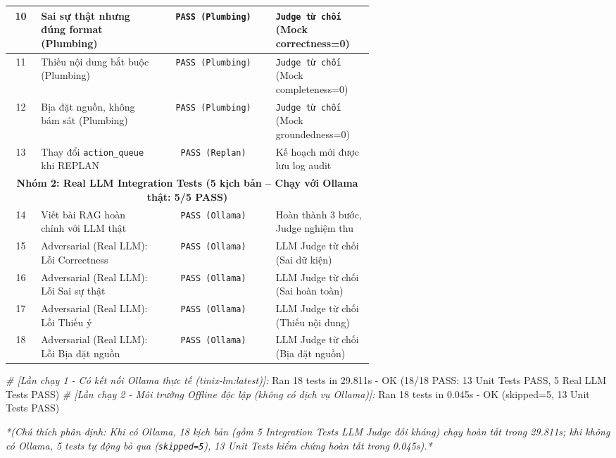 \documentclass[]{article}
\newenvironment{Shaded}{}{}
\newcommand{\CommentTok}[1]{\textcolor[rgb]{0.38,0.63,0.69}{\textit{#1}}}
\newcommand{\DecValTok}[1]{\textcolor[rgb]{0.25,0.63,0.44}{#1}}
\newcommand{\FloatTok}[1]{\textcolor[rgb]{0.25,0.63,0.44}{#1}}
\newcommand{\NormalTok}[1]{#1}
\newcommand{\OperatorTok}[1]{\textcolor[rgb]{0.40,0.40,0.40}{#1}}
\newcommand{\VariableTok}[1]{\textcolor[rgb]{0.10,0.09,0.49}{#1}}
\begin{document}
\begin{longtable}{|c|p{0.33\linewidth}|c|p{0.27\linewidth}|}
10 & Sai sự thật nhưng đúng format (Plumbing) & \texttt{PASS (Plumbing)} & \texttt{Judge từ chối} (Mock correctness=0) \\ \hline
11 & Thiếu nội dung bắt buộc (Plumbing) & \texttt{PASS (Plumbing)} & \texttt{Judge từ chối} (Mock completeness=0) \\ \hline
12 & Bịa đặt nguồn, không bám sát (Plumbing) & \texttt{PASS (Plumbing)} & \texttt{Judge từ chối} (Mock groundedness=0) \\ \hline
13 & Thay đổi \texttt{action\_queue} khi REPLAN & \texttt{PASS (Replan)} & Kế hoạch mới được lưu log audit \\ \hline
\multicolumn{4}{|c|}{\cellcolor{primary!10}\rule{0pt}{2.8ex}\rule[-1.0ex]{0pt}{0pt}\textbf{\color{primary}Nhóm 2: Real LLM Integration Tests (5 kịch bản -- Chạy với Ollama thật: 5/5 PASS)}} \\ \hline
14 & Viết bài RAG hoàn chỉnh với LLM thật & \texttt{PASS (Ollama)} & Hoàn thành 3 bước, Judge nghiệm thu \\ \hline
15 & Adversarial (Real LLM): Lỗi Correctness & \texttt{PASS (Ollama)} & LLM Judge từ chối (Sai dữ kiện) \\ \hline
16 & Adversarial (Real LLM): Lỗi Sai sự thật & \texttt{PASS (Ollama)} & LLM Judge từ chối (Sai hoàn toàn) \\ \hline
17 & Adversarial (Real LLM): Lỗi Thiếu ý & \texttt{PASS (Ollama)} & LLM Judge từ chối (Thiếu nội dung) \\ \hline
18 & Adversarial (Real LLM): Lỗi Bịa đặt nguồn & \texttt{PASS (Ollama)} & LLM Judge từ chối (Bịa đặt nguồn) \\ \hline
\end{longtable}
\renewcommand{\arraystretch}{1.0}
\vspace{-2mm}

\begin{Shaded}
\begin{Highlighting}[]
\CommentTok{# [Lần chạy 1 - Có kết nối Ollama thực tế (tinix-lm:latest)]:}
\NormalTok{Ran }\DecValTok{18}\NormalTok{ tests in }\FloatTok{29.811}\NormalTok{s }\OperatorTok{-} \VariableTok{OK}\NormalTok{ (}\DecValTok{18}\NormalTok{/}\DecValTok{18}\NormalTok{ PASS: }\DecValTok{13}\NormalTok{ Unit Tests PASS, }\DecValTok{5}\NormalTok{ Real LLM Tests PASS)}
\CommentTok{# [Lần chạy 2 - Môi trường Offline độc lập (không có dịch vụ Ollama)]:}
\NormalTok{Ran }\DecValTok{18}\NormalTok{ tests in }\FloatTok{0.045}\NormalTok{s }\OperatorTok{-} \VariableTok{OK}\NormalTok{ (skipped=}\DecValTok{5}\NormalTok{, }\DecValTok{13}\NormalTok{ Unit Tests PASS)}
\end{Highlighting}
\end{Shaded}
\vspace{-1mm}
{\footnotesize \textit{*(Chú thích phân định: Khi có Ollama, 18 kịch bản (gồm 5 Integration Tests LLM Judge đối kháng) chạy hoàn tất trong 29.811s; khi không có Ollama, 5 tests tự động bỏ qua (\texttt{skipped=5}), 13 Unit Tests kiểm chứng hoàn tất trong 0.045s).* }}
\end{document}
